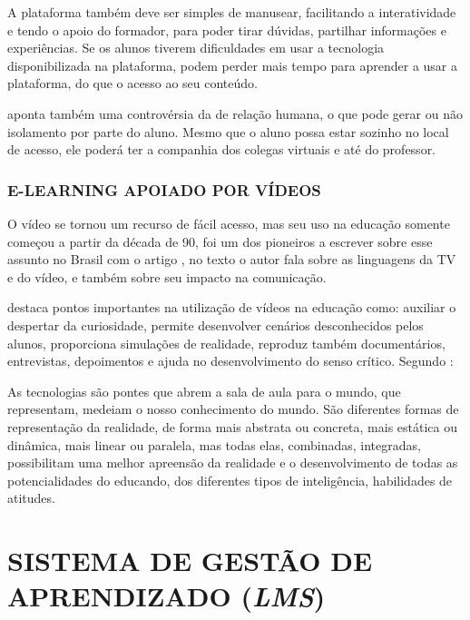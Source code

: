 A plataforma também deve ser simples de manusear, facilitando a interatividade e tendo o apoio do formador, para poder tirar dúvidas, partilhar informações e experiências. Se os alunos tiverem dificuldades em usar a tecnologia disponibilizada na plataforma, podem perder mais tempo para aprender a usar a plataforma, do que o acesso ao seu conteúdo. 

 aponta também uma controvérsia da  de relação humana, o que pode gerar ou não isolamento por parte do aluno. Mesmo que o aluno possa estar sozinho no local de acesso, ele poderá ter a companhia dos colegas virtuais e até do professor.

\subsubsection{E-LEARNING APOIADO POR VÍDEOS}
O vídeo se tornou um recurso de fácil acesso, mas seu uso na educação somente começou a partir da década de 90,  foi um dos pioneiros a escrever sobre esse assunto no Brasil com o artigo , no texto o autor fala sobre as linguagens da TV e do vídeo, e também sobre seu impacto na comunicação.

 destaca pontos importantes na utilização de vídeos na educação como: auxiliar o despertar da curiosidade, permite desenvolver cenários desconhecidos pelos alunos, proporciona simulações de realidade, reproduz também documentários, entrevistas, depoimentos e ajuda no desenvolvimento do senso crítico. Segundo :
\begin{citacao}
  As tecnologias são pontes que abrem a sala de aula para o mundo, que representam, medeiam o nosso conhecimento do mundo. São diferentes formas de representação da realidade, de forma mais abstrata ou concreta, mais estática ou dinâmica, mais linear ou paralela, mas todas elas, combinadas, integradas, possibilitam uma melhor apreensão da realidade e o desenvolvimento de todas as potencialidades do educando, dos diferentes tipos de inteligência, habilidades de atitudes.
\end{citacao}

\section{SISTEMA DE GESTÃO DE APRENDIZADO (\textit{LMS})}
\label{sec:lms}

